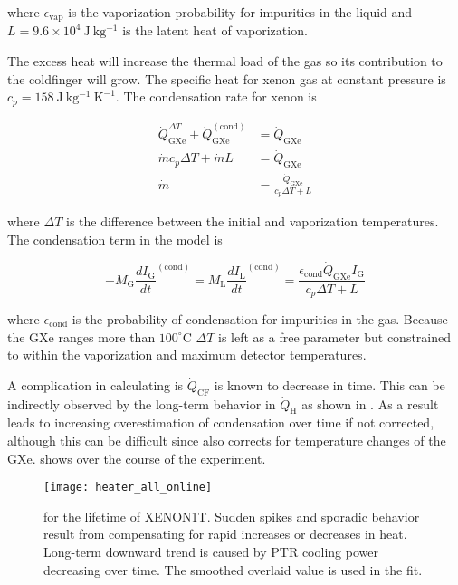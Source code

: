 \noindent where $\epsilon_{\mathrm{vap}}$ is the vaporization probability for impurities in the liquid and
$L = 9.6 \times 10^4\ \mathrm{J\ kg^{-1}}$ is the latent heat of vaporization.

The excess heat will increase the thermal load of the gas so its contribution to the coldfinger will grow.  The specific heat for
xenon gas at constant pressure is $c_p = 158\ \mathrm{J\ kg^{-1}\ K^{-1}}$.  The condensation rate for xenon is

\begin{equation}
\begin{aligned}
\dot{Q}_{\mathrm{GXe}}^{\Delta T} + \dot{Q}_{\mathrm{GXe}}^{(\mathrm{cond})} &= \dot{Q}_{\mathrm{GXe}} \\
\dot{m} c_p \Delta T + \dot{m} L &= \dot{Q}_{\mathrm{GXe}} \\
\dot{m} &= \frac{\dot{Q}_{\mathrm{GXe}}}{c_p \Delta T + L}
\end{aligned}
\end{equation}

\noindent where $\Delta T$ is the difference between the initial and vaporization temperatures.  The condensation term in the model is

\begin{equation}
-M_{\mathrm{G}} \frac{dI_{\mathrm{G}}}{dt}^{(\mathrm{cond})} = M_{\mathrm{L}} \frac{dI_{\mathrm{L}}}{dt}^{(\mathrm{cond})} =
\frac{\epsilon_{\mathrm{cond}} \dot{Q}_{\mathrm{GXe}} I_{\mathrm{G}}}{c_p \Delta T + L}
\end{equation}

\noindent where $\epsilon_{\mathrm{cond}}$ is the probability of condensation for impurities in the gas.  Because the GXe ranges more
than $100^{\circ}\mathrm{C}$ $\Delta T$ is left as a free parameter but constrained to within the vaporization and maximum detector
temperatures.

A complication in calculating \qdg is $\dot{Q}_{\mathrm{CF}}$ is known to decrease in time.  This can be indirectly observed by
the long-term behavior in $\dot{Q}_{\mathrm{H}}$ as shown in .  As a result
 leads to increasing overestimation of condensation over time if not
corrected, although this can be difficult since \qdh also corrects for temperature changes of the
GXe.   shows \qdh over the course of the experiment.

\begin{figure}
\centering
\texttt{[image: heater\_all\_online]}
\caption{\qdh for the lifetime of XENON1T.  Sudden spikes and sporadic behavior result from compensating for rapid increases or decreases
in heat.  Long-term downward trend is caused by PTR cooling power decreasing over time.  The smoothed overlaid value is used in the fit.}
\label{fig:electron_lifetime_model_vap_and_cond_heater_all}
\end{figure}



